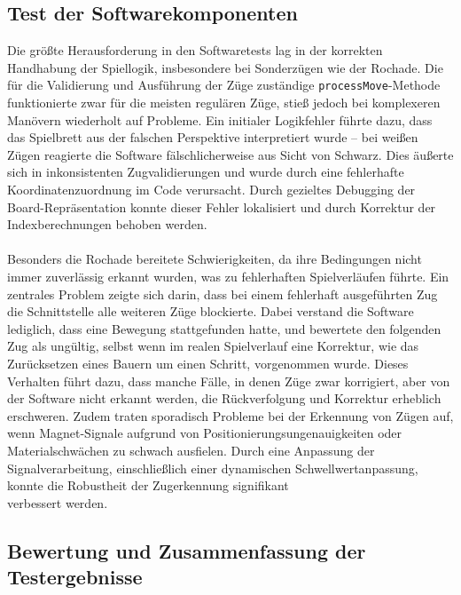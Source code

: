 \documentclass[a4paper]{article}
\begin{document}
\subsection{Test der Softwarekomponenten}
\label{sec:softwaretest}
Die größte Herausforderung in den Softwaretests lag in der korrekten Handhabung der Spiellogik, insbesondere bei Sonderzügen wie der Rochade. Die für die Validierung und Ausführung der Züge zuständige \texttt{processMove}-Methode funktionierte zwar für die meisten regulären Züge, stieß jedoch bei komplexeren Manövern wiederholt auf Probleme. Ein initialer Logikfehler führte dazu, dass das Spielbrett aus der falschen Perspektive interpretiert wurde – bei weißen Zügen reagierte die Software fälschlicherweise aus Sicht von Schwarz. Dies äußerte sich in inkonsistenten Zugvalidierungen und wurde durch eine fehlerhafte Koordinatenzuordnung im Code verursacht. Durch gezieltes Debugging der Board-Repräsentation konnte dieser Fehler lokalisiert und durch Korrektur der Indexberechnungen behoben werden.\\
\\
Besonders die Rochade bereitete Schwierigkeiten, da ihre Bedingungen nicht immer zuverlässig erkannt wurden, was zu fehlerhaften Spielverläufen führte. Ein zentrales Problem zeigte sich darin, dass bei einem fehlerhaft ausgeführten Zug die Schnittstelle alle weiteren Züge blockierte. Dabei verstand die Software lediglich, dass eine Bewegung stattgefunden hatte, und bewertete den folgenden Zug als ungültig, selbst wenn im realen Spielverlauf eine Korrektur, wie das Zurücksetzen eines Bauern um einen Schritt, vorgenommen wurde. Dieses Verhalten führt dazu, dass manche Fälle, in denen Züge zwar korrigiert, aber von der Software nicht erkannt werden, die Rückverfolgung und Korrektur erheblich erschweren. Zudem traten sporadisch Probleme bei der Erkennung von Zügen auf, wenn Magnet-Signale aufgrund von Positionierungsungenauigkeiten oder Materialschwächen zu schwach ausfielen. Durch eine Anpassung der Signalverarbeitung, einschließlich einer dynamischen Schwellwertanpassung, konnte die Robustheit der Zugerkennung signifikant\\ verbessert werden.

\subsection{Bewertung und Zusammenfassung der Testergebnisse}
\label{sec:bewertung}
\end{document}
